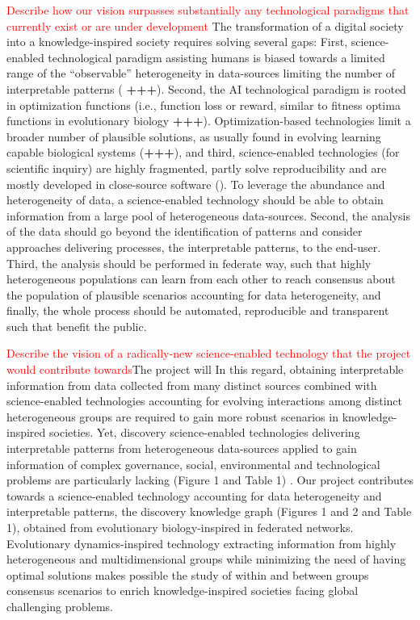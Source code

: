 \documentclass[11pt, a4paper]{article} %
\begin{document}
\textcolor{red}{Describe how our vision surpasses substantially any
  technological paradigms that currently exist or are under
  development} The transformation of a digital society into a
knowledge-inspired society requires solving several gaps: First,
science-enabled technological paradigm assisting humans is biased
towards a limited range of the ``observable'' heterogeneity in
data-sources limiting the number of interpretable patterns ({\bf
  +++}). Second, the AI technological paradigm is rooted in
optimization functions (i.e., function loss or reward, similar to
fitness optima functions in evolutionary biology {\bf
  +++}). Optimization-based technologies limit a broader number of
plausible solutions, as usually found in evolving learning capable
biological systems ({\bf +++}), and third, science-enabled
technologies (for scientific inquiry) are highly fragmented, partly
solve reproducibility and are mostly developed in close-source
software
(\citep{Inhaber1977,Ioannidis2005,Fang2011,Gunther2018,Hardwicke2018,Mehrabi2019,Real2020}). To
leverage the abundance and heterogeneity of data, a science-enabled
technology should be able to obtain information from a large pool of
heterogeneous data-sources. Second, the analysis of the data should go
beyond the identification of patterns and consider approaches
delivering processes, the interpretable patterns, to the
end-user. Third, the analysis should be performed in federate way,
such that highly heterogeneous populations can learn from each other
to reach consensus about the population of plausible scenarios
accounting for data heterogeneity, and finally, the whole process
should be automated, reproducible and transparent such that benefit
the public.

\textcolor{red}{Describe the vision of a radically-new
  science-enabled technology that the project would contribute
  towards}The project will
In this regard, obtaining interpretable information from data
collected from many distinct sources combined with science-enabled
technologies accounting for evolving interactions among distinct
heterogeneous groups are required to gain more robust scenarios in
knowledge-inspired societies. Yet, discovery science-enabled
technologies delivering interpretable patterns from heterogeneous
data-sources applied to gain information of complex governance,
social, environmental and technological problems are particularly
lacking (Figure 1 and Table 1) \citep{Mastrangelo2019}. Our project
contributes towards a science-enabled technology accounting for data
heterogeneity and interpretable patterns, the discovery knowledge
graph (Figures 1 and 2 and Table 1), obtained from evolutionary
biology-inspired in federated networks. Evolutionary dynamics-inspired
technology extracting information from highly heterogeneous and
multidimensional groups while minimizing the need of having optimal
solutions makes possible the study of within and between groups
consensus scenarios to enrich knowledge-inspired societies facing
global challenging problems.
\end{document}
